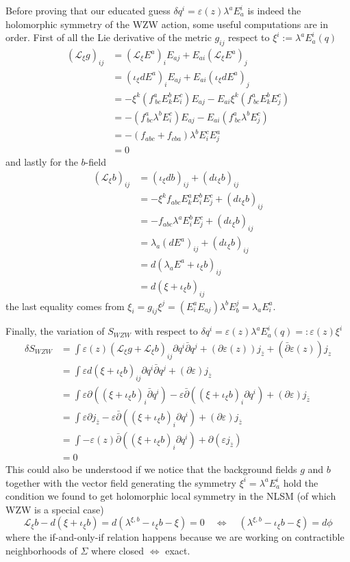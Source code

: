 \documentclass[a4paper,12pt]{article}
\numberwithin{equation}{section}
\numberwithin{thm}{section}
\numberwithin{exm}{section}
\newcommand{\p}{\partial}
\newcommand{\pb}{\bar\partial}
\newcommand{\lag}{\mathcal L}
\newcommand{\zb}{{\bar z}}
\newcommand{\<}{{\langle}}
\renewcommand{\>}{{\rangle}}
\renewcommand{\d}{{\delta}}
\newcommand{\ve}{{\varepsilon}}
\renewcommand{\i}{{\iota}}
\renewcommand{\l}{{\lambda}}
\renewcommand{\S}{{\Sigma}}
\begin{document}
Before proving that our educated guess $\d q^i = \ve(z) \l^a E_a^i$ is indeed the holomorphic symmetry of the WZW action, some useful computations are in order. First of all the Lie derivative of the metric $g_{ij}$ respect to $\xi^i := \l^a E^i_a(q)$
	\begin{align}
	(\lag_\xi g)_{ij} & = (\lag_\xi E^a)_i E_{aj} + E_{ai}(\lag_\xi E^a)_j \nonumber \\
	& = (\i_\xi dE^a)_i E_{aj} + E_{ai} (\i_\xi dE^a)_j \nonumber \\
	& = - \xi^k (f^a_{\ bc} E_k^b E_i^c) E_{aj} - E_{ai} \xi^k (f^a_{\ bc} E_k^b E_j^c) \nonumber \\
	& = - (f^a_{\ bc} \l^b E_i^c) E_{aj} - E_{ai} (f^a_{\ bc} \l^b E_j^c) \nonumber \\
	& = - (f_{abc} + f_{cba}) \l^b E_i^c E_j^a \nonumber \\
	& = 0
	\end{align}
and lastly for the $b$-field
	\begin{align}
	(\lag_\xi b)_{ij} & = (\i_\xi db)_{ij} + (d\i_\xi b)_{ij} \nonumber \\
	& = - \xi^k f_{abc}E^a_k E^b_i E^c_j + (d\i_\xi b)_{ij} \nonumber \\
	& = - f_{abc} \l^a E^b_i E^c_j + (d\i_\xi b)_{ij} \nonumber \\
	& = \l_a (dE^a)_{ij} + (d\i_\xi b)_{ij} \nonumber \\
	& = d(\l_a E^a + \i_\xi b)_{ij} \nonumber \\
	& = d(\xi + \i_\xi b)_{ij}
	\end{align}
the last equality comes from $\xi_i = g_{ij}\xi^j = (E^a_i E_{aj})\l^b E^j_b = \l_a E^a_i$.

Finally, the variation of $S_{WZW}$ with respect to $\d q^i = \ve(z)\l^a E^i_a(q) =: \ve(z)\xi^i$
	\begin{align}
	\d S_{WZW} & = \int \ve(z)(\lag_\xi g + \lag_\xi b)_{ij}\p q^i\pb q^j + (\p\ve(z)) j_\zb + (\pb\ve(z)) j_z \nonumber \\
	& = \int \ve d(\xi + \i_\xi b)_{ij}\p q^i\pb q^j + (\p\ve) j_\zb \nonumber \\
	& = \int \ve \p((\xi + \i_\xi b)_i \pb q^i) - \ve\pb((\xi + \i_\xi b)_i \p q^i) + (\p\ve) j_\zb \nonumber \\
	& = \int \ve \p j_\zb - \ve\pb((\xi + \i_\xi b)_i \p q^i) + (\p\ve) j_\zb \nonumber \\
	& = \int -\ve(z) \pb((\xi + \i_\xi b)_i \p q^i) + \p (\ve j_\zb) \nonumber \\
	& = 0
	\end{align}
This could also be understood if we notice that the background fields $g$ and $b$ together with the vector field generating the symmetry $\xi^i = \l^a E^i_a$ hold the condition we found to get holomorphic local symmetry in the NLSM (of which WZW is a special case)
	\begin{equation}
	\lag_\xi b - d(\xi + \i_\xi b) = d(\l^{\xi,b} - \i_\xi b - \xi) = 0 \quad\Leftrightarrow\quad (\l^{\xi,b} - \i_\xi b - \xi) = d\phi
	\end{equation}
where the if-and-only-if relation happens because we are working on contractible neighborhoods of $\S$ where closed $\Leftrightarrow$ exact.
\end{document}
